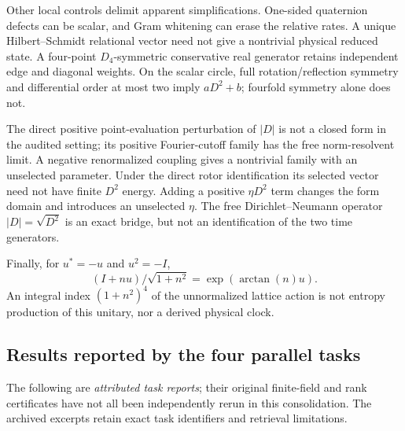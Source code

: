 Other local controls delimit apparent simplifications. One-sided quaternion
defects can be scalar, and Gram whitening can erase the relative rates.
A unique Hilbert--Schmidt relational vector need not give a nontrivial
physical reduced state. A four-point $D_4$-symmetric conservative real
generator retains independent edge and diagonal weights. On the scalar
circle, full rotation/reflection symmetry and differential order at most
two imply $aD^2+b$; fourfold symmetry alone does not.

The direct positive point-evaluation perturbation of $|D|$ is not a closed
form in the audited setting; its positive Fourier-cutoff family has the
free norm-resolvent limit. A negative renormalized coupling gives a
nontrivial family with an unselected parameter. Under the direct rotor
identification its selected vector need not have finite $D^2$ energy.
Adding a positive $\eta D^2$ term changes the form domain and introduces
an unselected $\eta$. The free Dirichlet--Neumann operator $|D|=\sqrt{D^2}$
is an exact bridge, but not an identification of the two time generators.

Finally, for $u^*=-u$ and $u^2=-I$,
\[
 (I+nu)/\sqrt{1+n^2}=\exp(\arctan(n)u).
\]
An integral index $(1+n^2)^4$ of the unnormalized lattice action is not
entropy production of this unitary, nor a derived physical clock.

\subsection{Results reported by the four parallel tasks}

The following are \emph{attributed task reports}; their original finite-field
and rank certificates have not all been independently rerun in this
consolidation. The archived excerpts retain exact task identifiers and
retrieval limitations.

